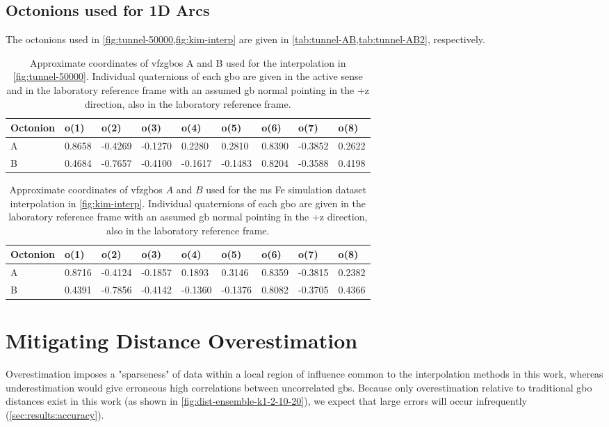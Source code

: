\documentclass[preprint,12pt]{elsarticle}
\begin{document}
\subsection{Octonions used for 1D Arcs}
The octonions used in \cref{fig:tunnel-50000,fig:kim-interp} are given in \cref{tab:tunnel-AB,tab:tunnel-AB2}, respectively.
\begin{table}[]
\centering
\caption{Approximate coordinates of \glspl{vfzgbo} A and B used for the interpolation in \cref{fig:tunnel-50000}. Individual quaternions of each \gls{gbo} are given in the active sense and in the laboratory reference frame with an assumed \gls{gb} normal pointing in the +z direction, also in the laboratory reference frame.}
\label{tab:tunnel-AB}
\begin{tabular}{@{}lllllllll@{}}
\toprule
Octonion & o(1)   & o(2)    & o(3)    & o(4)    & o(5)    & o(6)   & o(7)    & o(8)   \\ \midrule
A        & 0.8658 & -0.4269 & -0.1270 & 0.2280  & 0.2810  & 0.8390 & -0.3852 & 0.2622 \\
B        & 0.4684 & -0.7657 & -0.4100 & -0.1617 & -0.1483 & 0.8204 & -0.3588 & 0.4198 \\ \bottomrule
\end{tabular}
\end{table}

\begin{table}
\centering
\caption{Approximate coordinates of \glspl{vfzgbo} $A$ and $B$ used for the \gls{ms} Fe simulation dataset interpolation in \cref{fig:kim-interp}. Individual quaternions of each \gls{gbo} are given in the laboratory reference frame with an assumed \gls{gb} normal pointing in the +z direction, also in the laboratory reference frame.}
\label{tab:tunnel-AB2}
\begin{tabular}{lllllllll}
\hline
Octonion & o(1)   & o(2)    & o(3)    & o(4)    & o(5)    & o(6)   & o(7)    & o(8)   \\ \hline
A        & 0.8716 & -0.4124 & -0.1857 & 0.1893  & 0.3146  & 0.8359 & -0.3815 & 0.2382 \\
B        & 0.4391 & -0.7856 & -0.4142 & -0.1360 & -0.1376 & 0.8082 & -0.3705 & 0.4366 \\ \hline
\end{tabular}
\end{table}
%
\section{Mitigating Distance Overestimation} \label{sec:overestimation}
Overestimation imposes a "sparseness" of data within a local region of influence common to the interpolation methods in this work, whereas underestimation would give erroneous high correlations between uncorrelated \glspl{gb}. Because only overestimation relative to traditional \gls{gbo} distances exist in this work (as shown in \cref{fig:dist-ensemble-k1-2-10-20}), we expect that large errors will occur infrequently (\cref{sec:results:accuracy}). 
\end{document}
